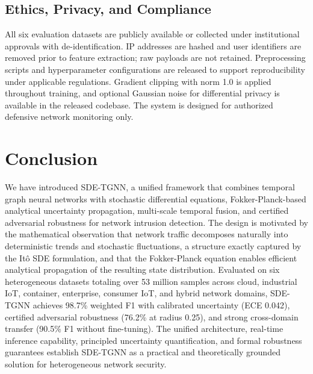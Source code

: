 \documentclass[journal]{IEEEtran}
\begin{document}
\subsection{Ethics, Privacy, and Compliance}

All six evaluation datasets are publicly available or collected under institutional approvals with de-identification. IP addresses are hashed and user identifiers are removed prior to feature extraction; raw payloads are not retained. Preprocessing scripts and hyperparameter configurations are released to support reproducibility under applicable regulations. Gradient clipping with norm 1.0 is applied throughout training, and optional Gaussian noise for differential privacy is available in the released codebase. The system is designed for authorized defensive network monitoring only.


\section{Conclusion}
\label{sec:conclusion}

We have introduced SDE-TGNN, a unified framework that combines temporal graph neural networks with stochastic differential equations, Fokker-Planck-based analytical uncertainty propagation, multi-scale temporal fusion, and certified adversarial robustness for network intrusion detection. The design is motivated by the mathematical observation that network traffic decomposes naturally into deterministic trends and stochastic fluctuations, a structure exactly captured by the It\^{o} SDE formulation, and that the Fokker-Planck equation enables efficient analytical propagation of the resulting state distribution. Evaluated on six heterogeneous datasets totaling over 53 million samples across cloud, industrial IoT, container, enterprise, consumer IoT, and hybrid network domains, SDE-TGNN achieves 98.7\% weighted F1 with calibrated uncertainty (ECE 0.042), certified adversarial robustness (76.2\% at radius 0.25), and strong cross-domain transfer (90.5\% F1 without fine-tuning). The unified architecture, real-time inference capability, principled uncertainty quantification, and formal robustness guarantees establish SDE-TGNN as a practical and theoretically grounded solution for heterogeneous network security.


\end{document}
